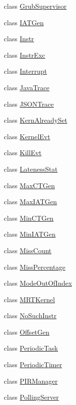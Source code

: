 \begin{DoxyCompactItemize}
class \hyperlink{classRTSim_1_1GrubSupervisor}{Grub\+Supervisor}
\item 
class \hyperlink{classRTSim_1_1IATGen}{I\+A\+T\+Gen}
\item 
class \hyperlink{classRTSim_1_1Instr}{Instr}
\item 
class \hyperlink{classRTSim_1_1InstrExc}{Instr\+Exc}
\item 
class \hyperlink{classRTSim_1_1Interrupt}{Interrupt}
\item 
class \hyperlink{classRTSim_1_1JavaTrace}{Java\+Trace}
\item 
class \hyperlink{classRTSim_1_1JSONTrace}{J\+S\+O\+N\+Trace}
\item 
class \hyperlink{classRTSim_1_1KernAlreadySet}{Kern\+Already\+Set}
\item 
class \hyperlink{classRTSim_1_1KernelEvt}{Kernel\+Evt}
\item 
class \hyperlink{classRTSim_1_1KillEvt}{Kill\+Evt}
\item 
class \hyperlink{classRTSim_1_1LatenessStat}{Lateness\+Stat}
\item 
class \hyperlink{classRTSim_1_1MaxCTGen}{Max\+C\+T\+Gen}
\item 
class \hyperlink{classRTSim_1_1MaxIATGen}{Max\+I\+A\+T\+Gen}
\item 
class \hyperlink{classRTSim_1_1MinCTGen}{Min\+C\+T\+Gen}
\item 
class \hyperlink{classRTSim_1_1MinIATGen}{Min\+I\+A\+T\+Gen}
\item 
class \hyperlink{classRTSim_1_1MissCount}{Miss\+Count}
\item 
class \hyperlink{classRTSim_1_1MissPercentage}{Miss\+Percentage}
\item 
class \hyperlink{classRTSim_1_1ModeOutOfIndex}{Mode\+Out\+Of\+Index}
\item 
class \hyperlink{classRTSim_1_1MRTKernel}{M\+R\+T\+Kernel}
\item 
class \hyperlink{classRTSim_1_1NoSuchInstr}{No\+Such\+Instr}
\item 
class \hyperlink{classRTSim_1_1OffsetGen}{Offset\+Gen}
\item 
class \hyperlink{classRTSim_1_1PeriodicTask}{Periodic\+Task}
\item 
class \hyperlink{classRTSim_1_1PeriodicTimer}{Periodic\+Timer}
\item 
class \hyperlink{classRTSim_1_1PIRManager}{P\+I\+R\+Manager}
\item 
class \hyperlink{classRTSim_1_1PollingServer}{Polling\+Server}
\item 

\end{DoxyCompactItemize}
